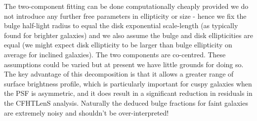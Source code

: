 \documentclass{article}
\begin{document}
The two-component fitting can be done computationally cheaply provided
we do not introduce any further free parameters in ellipticity or size - hence we fix
the bulge half-light radius to equal the disk exponential scale-length (as typically
found for brighter galaxies) and we also assume the bulge and disk ellipticities are
equal (we might expect disk ellipticity to be larger than bulge ellipticity on average
for inclined galaxies).  The two components are co-centred.
These assumptions could be varied but at present we have little grounds for doing so.
The key advantage of this decomposition is that it allows a greater range of surface brightness
profile, which is particularly important for cuspy galaxies when the PSF is asymmetric,
and it does result in a significant reduction in residuals in the CFHTLenS analysis.
Naturally the deduced bulge fractions for faint galaxies are extremely noisy and
shouldn't be over-interpreted!  
\end{document}
